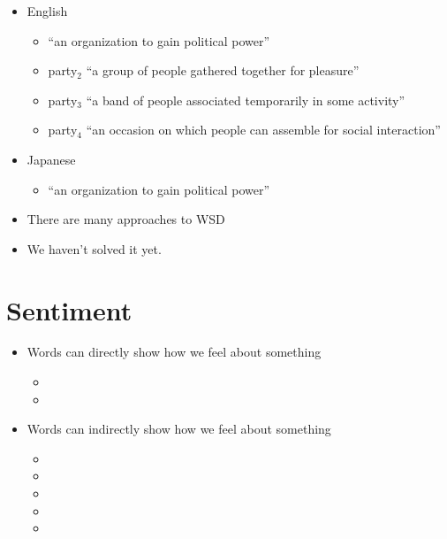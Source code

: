 \documentclass[a4paper,landscape,headrule,footrule,xetex]{foils}
\begin{document}
\begin{itemize}
\item English
\begin{itemize}
\item {} ``an organization to gain political power''
\item party$_2$ ``a group of people gathered together for pleasure''
\item party$_3$ ``a band of people associated temporarily in some activity''
\item party$_4$ ``an occasion on which people can assemble for social
  interaction''
\end{itemize}

\item Japanese
  \begin{itemize}
  \item {} ``an organization to gain political power''
  \end{itemize}
\end{itemize}


\begin{itemize}
\item There are many approaches to WSD
\item We haven't solved it yet.

\end{itemize}


\section{Sentiment}


\begin{itemize}
\item Words can directly show how we feel about something
  \begin{itemize}
  \item {}
  \item {}
  \end{itemize}
\item Words can indirectly show how we feel about something
  \begin{itemize}
  \item {}
  \item {}
 \item {}
 \item {}
 \item {}
  \end{itemize}
\end{itemize}
\end{document}
